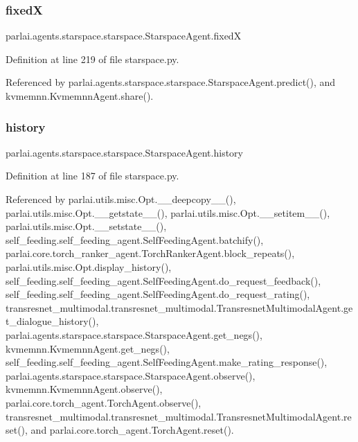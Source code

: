 \subsubsection{\texorpdfstring{fixedX}{fixedX}}
{\footnotesize\ttfamily parlai.\+agents.\+starspace.\+starspace.\+Starspace\+Agent.\+fixedX}



Definition at line 219 of file starspace.\+py.



Referenced by parlai.\+agents.\+starspace.\+starspace.\+Starspace\+Agent.\+predict(), and kvmemnn.\+Kvmemnn\+Agent.\+share().

\mbox{\label{classparlai_1_1agents_1_1starspace_1_1starspace_1_1StarspaceAgent_a652778d6927eaf8633dc1d8cbeab9409}} 
\subsubsection{\texorpdfstring{history}{history}}
{\footnotesize\ttfamily parlai.\+agents.\+starspace.\+starspace.\+Starspace\+Agent.\+history}



Definition at line 187 of file starspace.\+py.



Referenced by parlai.\+utils.\+misc.\+Opt.\+\_\+\+\_\+deepcopy\+\_\+\+\_\+(), parlai.\+utils.\+misc.\+Opt.\+\_\+\+\_\+getstate\+\_\+\+\_\+(), parlai.\+utils.\+misc.\+Opt.\+\_\+\+\_\+setitem\+\_\+\+\_\+(), parlai.\+utils.\+misc.\+Opt.\+\_\+\+\_\+setstate\+\_\+\+\_\+(), self\+\_\+feeding.\+self\+\_\+feeding\+\_\+agent.\+Self\+Feeding\+Agent.\+batchify(), parlai.\+core.\+torch\+\_\+ranker\+\_\+agent.\+Torch\+Ranker\+Agent.\+block\+\_\+repeats(), parlai.\+utils.\+misc.\+Opt.\+display\+\_\+history(), self\+\_\+feeding.\+self\+\_\+feeding\+\_\+agent.\+Self\+Feeding\+Agent.\+do\+\_\+request\+\_\+feedback(), self\+\_\+feeding.\+self\+\_\+feeding\+\_\+agent.\+Self\+Feeding\+Agent.\+do\+\_\+request\+\_\+rating(), transresnet\+\_\+multimodal.\+transresnet\+\_\+multimodal.\+Transresnet\+Multimodal\+Agent.\+get\+\_\+dialogue\+\_\+history(), parlai.\+agents.\+starspace.\+starspace.\+Starspace\+Agent.\+get\+\_\+negs(), kvmemnn.\+Kvmemnn\+Agent.\+get\+\_\+negs(), self\+\_\+feeding.\+self\+\_\+feeding\+\_\+agent.\+Self\+Feeding\+Agent.\+make\+\_\+rating\+\_\+response(), parlai.\+agents.\+starspace.\+starspace.\+Starspace\+Agent.\+observe(), kvmemnn.\+Kvmemnn\+Agent.\+observe(), parlai.\+core.\+torch\+\_\+agent.\+Torch\+Agent.\+observe(), transresnet\+\_\+multimodal.\+transresnet\+\_\+multimodal.\+Transresnet\+Multimodal\+Agent.\+reset(), and parlai.\+core.\+torch\+\_\+agent.\+Torch\+Agent.\+reset().

